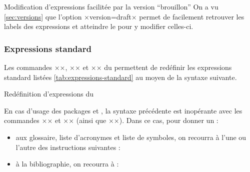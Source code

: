\begin{dbremark}{Modification d'expressions facilitée par la version
    \enquote{brouillon}}{}
  On a vu \vref{sec:versions} que l'option ×version=draft× permet de facilement
  retrouver les labels des expressions et atteindre le \File{\configurationfile}
  pour y modifier celles-ci.
\end{dbremark}

\subsubsection{Expressions standard}
\label{sec:expressions-standard}

Les commandes ×\addto×, ×\captionsfrench× et ×\captionsenglish× du
 permettent de redéfinir les expressions standard listées
\vref{tab:expressions-standard} au moyen de la syntaxe suivante.
\begin{preamblecode}[title=Par exemple dans le \File{\configurationfile}]
\addto{}
\addto{}
\end{preamblecode}
\begin{table}[hb]
  \centering
  
  \caption{Valeurs et commandes d'expressions standard du }
  \label{tab:expressions-standard}
\end{table}
\begin{dbexample}{Redéfinition d'expressions du }{}
\begin{preamblecode}[title=Par exemple dans le \File{\configurationfile}]
\addto{}
\addto{}
\end{preamblecode}
\end{dbexample}

En cas d'usage des packages  et , la
syntaxe précédente est inopérante avec les commandes ×\glossaryname× et
×\bibname× (ainsi que ×\refname×). Dans ce cas, pour donner un  :
\begin{itemize}
\item aux glossaire, liste d'acronymes et liste de symboles, on recourra
  à l'une ou l'autre des instructions suivantes :
\begin{bodycode}
\printglossary[title=÷\meta{titre alternatif}÷]
\printglossaries[title=÷\meta{titre alternatif}÷]
\printacronyms[title=÷\meta{titre alternatif}÷]
\printsymbols[title=÷\meta{titre alternatif}÷]
\end{bodycode}
\item à la bibliographie, on recourra à :
\begin{bodycode}
\printbibliography[title=÷\meta{titre alternatif}÷]
\end{bodycode}
\end{itemize}

